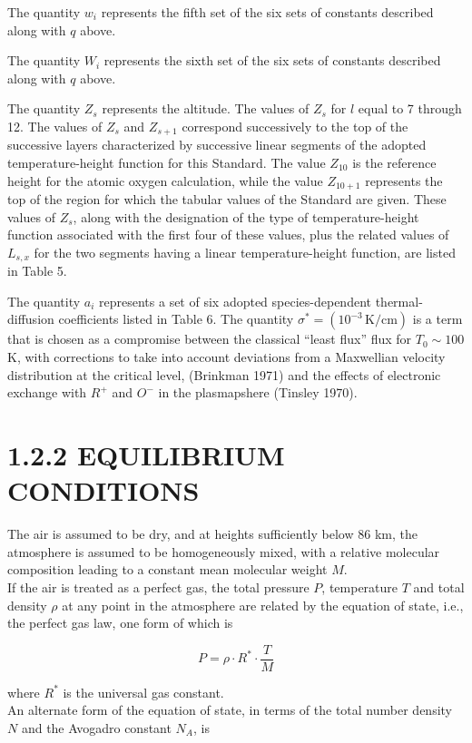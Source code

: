 \documentclass{article}
\begin{document}
The quantity \(w_i\) represents the fifth set of the six sets of constants described along with \(q\) above.

The quantity \(W_i\) represents the sixth set of the six sets of constants described along with \(q\) above.

The quantity \(Z_s\) represents the altitude. The values of \(Z_s\) for \(l\) equal to 7 through 12. The values of \(Z_s\) and \(Z_{s+1}\) correspond successively to the top of the successive layers characterized by successive linear segments of the adopted temperature-height function for this Standard. The value \(Z_{10}\) is the reference height for the atomic oxygen calculation, while the value \(Z_{10+1}\) represents the top of the region for which the tabular values of the Standard are given. These values of \(Z_s\), along with the designation of the type of temperature-height function associated with the first four of these values, plus the related values of \(L_{s,x}\) for the two segments having a linear temperature-height function, are listed in Table 5.

The quantity \(a_i\) represents a set of six adopted species-dependent thermal-diffusion coefficients listed in Table 6. The quantity \(\sigma^* = (10^{-3}\, \mathrm{K/cm})\) is a term that is chosen as a compromise between the classical “least flux” flux for \(T_{0} \sim 100\) K, with corrections to take into account deviations from a Maxwellian velocity distribution at the critical level, (Brinkman 1971) and the effects of electronic exchange with \(R^+\) and \(O^-\) in the plasmapshere (Tinsley 1970).

\section{1.2.2 EQUILIBRIUM CONDITIONS} 
The air is assumed to be dry, and at heights sufficiently below 86 km, the atmosphere is assumed to be homogeneously mixed, with a relative molecular composition leading to a constant mean molecular weight \(M\). \\
If the air is treated as a perfect gas, the total pressure \(P\), temperature \(T\) and total density \(\rho\) at any point in the atmosphere are related by the equation of state, i.e., the perfect gas law, one form of which is

\begin{equation}
    P = \rho \cdot R^* \cdot \frac{T}{M} \tag{1}
\end{equation}

where \(R^*\) is the universal gas constant. \\
An alternate form of the equation of state, in terms of the total number density \(N\) and the Avogadro constant \(N_A\), is
\end{document}
